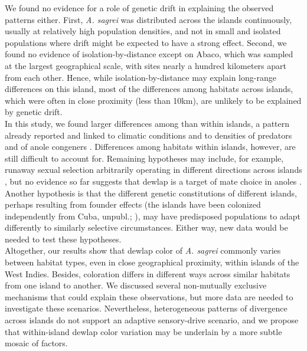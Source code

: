 We found no evidence for a role of genetic drift in explaining the observed patterns either. First, \textit{A. sagrei} was distributed across the islands continuously, usually at relatively high population densities, and not in small and isolated populations where drift might be expected to have a strong effect. Second, we found no evidence of isolation-by-distance except on Abaco, which was sampled at the largest geographical scale, with sites nearly a hundred kilometers apart from each other. Hence, while isolation-by-distance may explain long-range differences on this island, most of the differences among habitats across islands, which were often in close proximity (less than 10km), are unlikely to be explained by genetic drift.\\

In this study, we found larger differences among than within islands, a pattern already reported and linked to climatic conditions \citep{Vanhooydonck2009} and to densities of predators and of anole congeners \citep{Baeckens2018}. Differences among habitats within islands, however, are still difficult to account for. Remaining hypotheses may include, for example, runaway sexual selection arbitrarily operating in different directions across islands \citep{Andersson1994}, but no evidence so far suggests that dewlap is a target of mate choice in anoles \citep{Tokarz2002, Tokarz2005, Nicholson2007}. Another hypothesis is that the different genetic constitutions of different islands, perhaps resulting from founder effects (the islands have been colonized independently from Cuba, \citealt{vandeSchoot2016} unpubl.; \citealt{Driessens2017, Reynolds2020}), may have predisposed populations to adapt differently to similarly selective circumstances. Either way, new data would be needed to test these hypotheses.\\

Altogether, our results show that dewlap color of \textit{A. sagrei} commonly varies between habitat types, even in close geographical proximity, within islands of the West Indies. Besides, coloration differs in different ways across similar habitats from one island to another. We discussed several non-mutually exclusive mechanisms that could explain these observations, but more data are needed to investigate these scenarios. Nevertheless, heterogeneous patterns of divergence across islands do not support an adaptive sensory-drive scenario, and we propose that within-island dewlap color variation may be underlain by a more subtle mosaic of factors.


